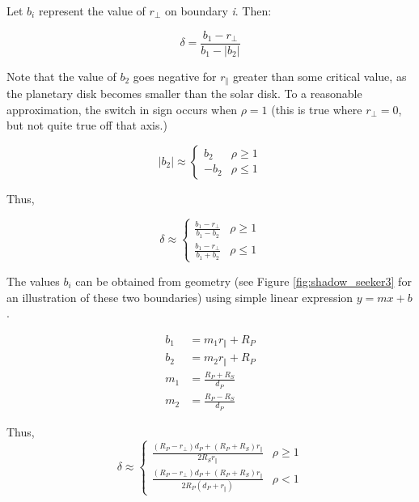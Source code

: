     Let $b_i$ represent the value of $r_\bot$ on boundary \textit{i}.  Then:

    \begin{equation*}
     \delta =
       \frac{b_1 - r_\bot}{b_1 - \left| b_2 \right|}
    \end{equation*}

    Note that the value of $b_2$ goes negative for $r_\Vert$ greater than
    some critical value, as the planetary disk becomes
    smaller than the solar disk.  To a reasonable approximation, the switch
    in sign occurs when $\rho = 1$ (this is true where $r_\bot = 0$, but
    not quite true off that axis.)

    \begin{equation*}
     \left| b_2 \right| \approx
      \begin{cases}
       b_2 & \rho \geqslant 1 \\
       -b_2 & \rho \leqslant 1
      \end{cases}
    \end{equation*}

    Thus,

    \begin{equation*}
     \delta \approx
      \begin{cases}
       \frac{b_1 - r_\bot}{b_1 - b_2} & \rho \geqslant 1 \\
       \frac{b_1 - r_\bot}{b_1 + b_2} & \rho \leqslant 1
      \end{cases}
    \end{equation*}

   The values $b_i$ can be obtained from geometry (see Figure
   \ref{fig:shadow_seeker3} for an illustration of these two boundaries)
   using simple linear expression $y = mx+b$.

   \begin{align*}
    b_1 &= m_1 r_\Vert + R_P \\
    b_2 &= m_2 r_\Vert + R_P \\
    m_1 &= \frac{R_P + R_S}{d_P} \\
    m_2 &= \frac{R_P - R_S}{d_P}
   \end{align*}

   Thus,
   \begin{equation}
     \delta \approx
      \begin{cases}
       \frac{(R_P - r_\bot) d_P + (R_P + R_S) r_\Vert}{2R_S r_\Vert} & \rho \geqslant 1 \\
       \frac{(R_P - r_\bot) d_P + (R_P + R_S) r_\Vert}{2 R_P( d_P + r_\Vert)} & \rho < 1
      \end{cases}
    \end{equation}


